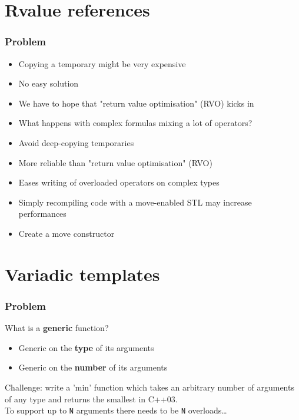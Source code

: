 \documentclass[xcolor=dvipsnames]{beamer}
\begin{document}
\section{Rvalue references}
\begin{frame}[fragile]
  \frametitle{Problem}

  

  \begin{itemize}
    \item Copying a temporary might be very expensive
    \item No easy solution
    \item We have to hope that "return value optimisation" (RVO) kicks in
    \item What happens with complex formulas mixing a lot of operators?
  \end{itemize}
\end{frame}
\begin{frame}[fragile]
  \begin{itemize}
    \item Avoid deep-copying temporaries
    \pause
    \item More reliable than "return value optimisation" (RVO)
    \pause
    \item Eases writing of overloaded operators on complex types
  \end{itemize}

  
  \pause
  \begin{itemize}
    \item Simply recompiling code with a move-enabled STL may increase performances
  \end{itemize}
\end{frame}

\begin{frame}[fragile]
  \begin{itemize}
    \item Create a move constructor
  \end{itemize}

  
\end{frame}

\section{Variadic templates}
\begin{frame}[fragile]
  \frametitle{Problem}
  What is a \textbf{generic} function?
  \pause
  \begin{itemize}
    \item Generic on the \textbf{type} of its arguments
      \pause
    \item Generic on the \textbf{number} of its arguments
  \end{itemize}
  \pause
  Challenge: write a 'min' function which takes an arbitrary number of arguments
  of any type and returns the smallest in C++03.\\
  \pause
  To support up to \verb#N# arguments there needs to be \verb#N# overloads\ldots
\end{frame}
\end{document}
